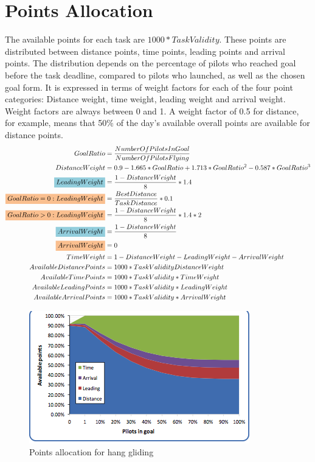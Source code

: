 \documentclass{article}
\begin{document}
\section{Points Allocation}
The available points for each task are \(1000*TaskValidity\). These points are
distributed between distance points, time points, leading points and arrival
points. The distribution depends on the percentage of pilots who reached goal
before the task deadline, compared to pilots who launched, as well as the
chosen goal form. It is expressed in terms of weight factors for each of the
four point categories: Distance weight, time weight, leading weight and arrival
weight. Weight factors are always between 0 and 1. A weight factor of 0.5 for
distance, for example, means that 50\% of the day’s available overall points
are available for distance points.
\begin{align*}
    GoalRatio &= \frac{NumberOfPilotsInGoal}{NumberOfPilotsFlying} \\
    DistanceWeight &= 0.9 - 1.665 * GoalRatio + 1.713 * GoalRatio^2 - 0.587 * GoalRatio^3 \\
    \hgh{LeadingWeight} &= \frac{1 - DistanceWeight}{8} * 1.4 \\
    \pgh{GoalRatio = 0 : LeadingWeight} &= \frac{BestDistance}{TaskDistance} * 0.1 \\
    \pgh{GoalRatio > 0 : LeadingWeight} &= \frac{1 - DistanceWeight}{8} * 1.4 * 2 \\
    \hgh{ArrivalWeight} &= \frac{1 - DistanceWeight}{8} \\
    \pgh{ArrivalWeight} &= 0 \\
    TimeWeight &= 1 - DistanceWeight - LeadingWeight - ArrivalWeight \\
    AvailableDistancePoints &= 1000 * TaskValidity  DistanceWeight \\
    AvailableTimePoints &= 1000 * TaskValidity * TimeWeight \\
    AvailableLeadingPoints &= 1000 * TaskValidity * LeadingWeight \\
    AvailableArrivalPoints &= 1000 * TaskValidity * ArrivalWeight
\end{align*}

\begin{figure}[h]
    \centering
    \includegraphics[scale=0.8]{img/points-allocation-hg.png}
    \caption{Points allocation for hang gliding}
\end{figure}
\end{document}
